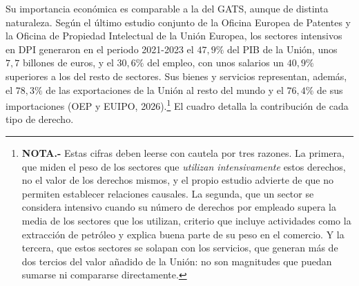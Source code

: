 \documentclass[10pt,a4paper]{article}
\begin{document}
Su importancia económica es comparable a la del GATS, aunque de distinta naturaleza. Según el último estudio conjunto de la Oficina Europea de Patentes y la Oficina de Propiedad Intelectual de la Unión Europea, los sectores intensivos en DPI generaron en el periodo 2021-2023 el $47,9\%$ del PIB de la Unión, unos $7,7$ billones de euros, y el $30,6\%$ del empleo, con unos salarios un $40,9\%$ superiores a los del resto de sectores. Sus bienes y servicios representan, además, el $78,3\%$ de las exportaciones de la Unión al resto del mundo y el $76,4\%$ de sus importaciones (OEP y EUIPO, 2026).\footnote{%
  \textbf{NOTA.-} Estas cifras deben leerse con cautela por tres razones. La primera, que miden el peso de los sectores que \textit{utilizan intensivamente} estos derechos, no el valor de los derechos mismos, y el propio estudio advierte de que no permiten establecer relaciones causales. La segunda, que un sector se considera intensivo cuando su número de derechos por empleado supera la media de los sectores que los utilizan, criterio que incluye actividades como la extracción de petróleo y explica buena parte de su peso en el comercio. Y la tercera, que estos sectores se solapan con los servicios, que generan más de dos tercios del valor añadido de la Unión: no son magnitudes que puedan sumarse ni compararse directamente.
} El cuadro detalla la contribución de cada tipo de derecho.
\end{document}
